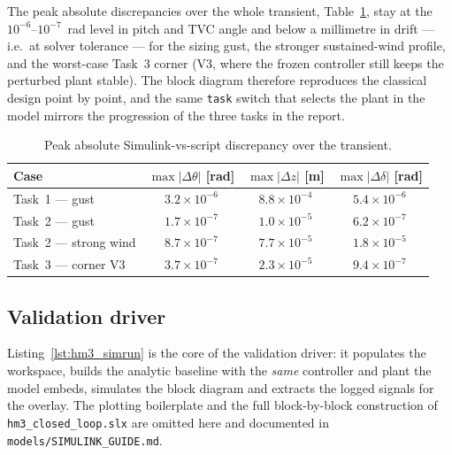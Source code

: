 \documentclass[../main_full_simulink.tex]{subfiles}
\begin{document}
The peak absolute discrepancies over the whole transient,
Table~\ref{tab:slx_agreement}, stay at the $10^{-6}$--$10^{-7}$~rad level in pitch
and TVC angle and below a millimetre in drift --- i.e.\ at solver tolerance ---
for the sizing gust, the stronger sustained-wind profile, and the worst-case
Task~3 corner (V3, where the frozen controller still keeps the perturbed plant
stable). The block diagram therefore reproduces the classical design point by
point, and the same \texttt{task} switch that selects the plant in the model
mirrors the progression of the three tasks in the report.

\begin{table}[H]
\centering
\caption{Peak absolute Simulink-vs-script discrepancy over the transient.}
\label{tab:slx_agreement}
\begin{tabular}{lccc}
\toprule
Case & $\max|\Delta\theta|$ [rad] & $\max|\Delta z|$ [m] & $\max|\Delta\delta|$ [rad] \\
\midrule
Task~1 --- gust        & $3.2\times10^{-6}$ & $8.8\times10^{-4}$ & $5.4\times10^{-6}$ \\
Task~2 --- gust        & $1.7\times10^{-7}$ & $1.0\times10^{-5}$ & $6.2\times10^{-7}$ \\
Task~2 --- strong wind & $8.7\times10^{-7}$ & $7.7\times10^{-5}$ & $1.8\times10^{-5}$ \\
Task~3 --- corner V3   & $3.7\times10^{-7}$ & $2.3\times10^{-5}$ & $9.4\times10^{-7}$ \\
\bottomrule
\end{tabular}
\end{table}

\subsection{Validation driver}

Listing~\ref{lst:hm3_simrun} is the core of the validation driver: it populates
the workspace, builds the analytic baseline with the \emph{same} controller and
plant the model embeds, simulates the block diagram and extracts the logged
signals for the overlay. The plotting boilerplate and the full block-by-block
construction of \texttt{hm3\_closed\_loop.slx} are omitted here and documented in
\texttt{models/SIMULINK\_GUIDE.md}.


\end{document}
